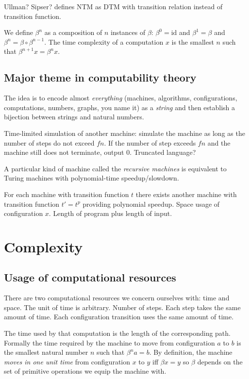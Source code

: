 \documentclass[10pt,statementpaper]{memoir}
\theoremstyle{definition}
\begin{document}
Ullman? Sipser? defines NTM as DTM with transition relation instead of transition function.

We define $\beta^n$ as a composition of $n$ instances of $\beta$:
$\beta^0 = \text{id}$ and $\beta^1 = \beta$ and $\beta^n = \beta \circ \beta^{n-1}$.
The time complexity of a computation $x$
is the smallest $n$ such that $\beta^{n+1} x = \beta^n x$.

\section{Major theme in computability theory}

The idea is to encode almost \emph{everything}
(machines, algorithms, configurations, computations, numbers, graphs, you name it)
as a \emph{string} and then establish a bijection between strings and natural numbers.

Time-limited simulation of another machine:
simulate the machine as long as the number of steps do not exceed $f n$.
If the number of step exceeds $f n$ and the machine still does not terminate,
output $0$.
Truncated language?

A particular kind of machine called the \emph{recursive machines}
is equivalent to Turing machines with polynomial-time speedup/slowdown.

For each machine with transition function $t$ there exists another machine
with transition function $t' = t^p$
providing polynomial speedup.
Space usage of configuration $x$.
Length of program plus length of input.

\chapter{Complexity}

\section{Usage of computational resources}

There are two computational resources we concern ourselves with:
time and space.
The unit of time is arbitrary.
Number of steps. Each step takes the same amount of time.
Each configuration transition uses the same amount of time.

The time used by that computation is the length of the corresponding path.
Formally the time required by the machine
to move from configuration $a$ to $b$ is
the smallest natural number $n$ such that $\beta^n a = b$.
By definition, the machine \emph{moves in one unit time} from configuration $x$ to $y$ iff $\beta x = y$
so $\beta$ depends on the set of primitive operations we equip the machine with.
\end{document}
